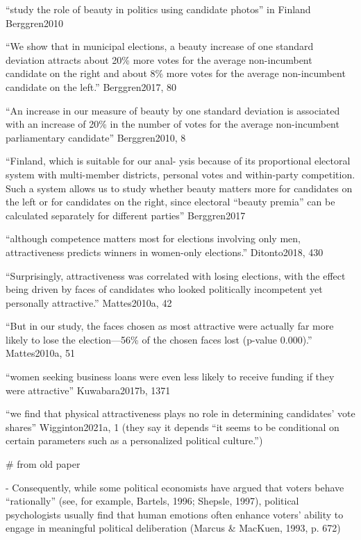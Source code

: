



		``study the role of beauty in politics using candidate photos'' in Finland Berggren2010

		``We show that in municipal elections, a beauty increase of one standard deviation attracts about 20\% more votes for the average non-incumbent candidate on the right and about 8\% more votes for the average non-incumbent candidate on the left.'' Berggren2017, 80

		``An increase in our measure of beauty by one standard deviation is associated with an increase of 20\% in the number of votes for the average non-incumbent parliamentary candidate'' Berggren2010, 8

		``Finland, which is suitable for our anal- ysis because of its proportional electoral system with multi-member districts, personal votes and within-party competition. Such a system allows us to study whether beauty matters more for candidates on the left or for candidates on the right, since electoral “beauty premia” can be calculated separately for different parties'' Berggren2017


		``although competence matters most for elections involving only men, attractiveness predicts winners in women-only elections.'' Ditonto2018, 430

		``Surprisingly, attractiveness was correlated with losing elections, with the effect being driven by faces of candidates who looked politically incompetent yet personally attractive.'' Mattes2010a, 42

		``But in our study, the faces chosen as most attractive were actually far more likely to lose the election—56\% of the chosen faces lost (p-value 0.000).'' Mattes2010a, 51

		``women seeking business loans were even less likely to receive funding if they were attractive'' Kuwabara2017b, 1371

		``we find that physical attractiveness plays no role in determining candidates’ vote shares'' Wigginton2021a, 1 (they say it depends ``it seems to be conditional on certain parameters such as a personalized political culture.'')


# from old paper

- Consequently, while some political economists have argued that voters behave “rationally” (see, for example, Bartels, 1996; Shepsle, 1997), political psychologists usually find that human emotions often enhance voters’ ability to engage in meaningful political deliberation (Marcus & MacKuen, 1993, p. 672)
